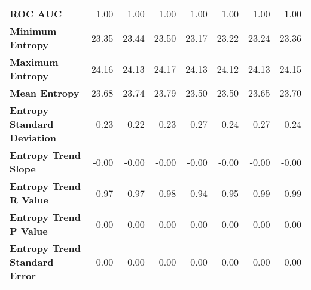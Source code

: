 \begin{tabular}{lrrrrrrr}
\textbf{ROC AUC} & 1.00 & 1.00 & 1.00 & 1.00 & 1.00 & 1.00 & 1.00 \\
\textbf{Minimum Entropy} & 23.35 & 23.44 & 23.50 & 23.17 & 23.22 & 23.24 & 23.36 \\
\textbf{Maximum Entropy} & 24.16 & 24.13 & 24.17 & 24.13 & 24.12 & 24.13 & 24.15 \\
\textbf{Mean Entropy} & 23.68 & 23.74 & 23.79 & 23.50 & 23.50 & 23.65 & 23.70 \\
\textbf{Entropy Standard Deviation} & 0.23 & 0.22 & 0.23 & 0.27 & 0.24 & 0.27 & 0.24 \\
\textbf{Entropy Trend Slope} & -0.00 & -0.00 & -0.00 & -0.00 & -0.00 & -0.00 & -0.00 \\
\textbf{Entropy Trend R Value} & -0.97 & -0.97 & -0.98 & -0.94 & -0.95 & -0.99 & -0.99 \\
\textbf{Entropy Trend P Value} & 0.00 & 0.00 & 0.00 & 0.00 & 0.00 & 0.00 & 0.00 \\
\textbf{Entropy Trend Standard Error} & 0.00 & 0.00 & 0.00 & 0.00 & 0.00 & 0.00 & 0.00 \\
\bottomrule
\end{tabular}
